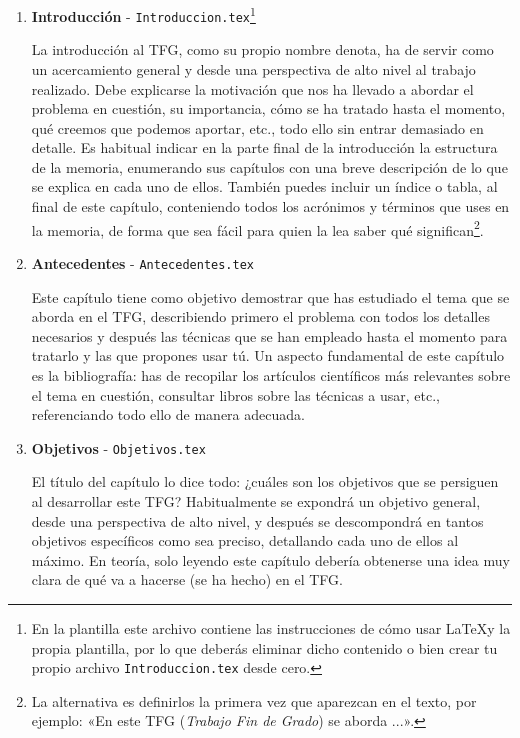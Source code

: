 \begin{enumerate}
    \item \textbf{Introducción} - \texttt{Introduccion.tex}\footnote{En la plantilla este archivo contiene las instrucciones de cómo usar \LaTeX y la propia plantilla, por lo que deberás eliminar dicho contenido o bien crear tu propio archivo \texttt{Introduccion.tex} desde cero.} \par
          La introducción al TFG, como su propio nombre denota, ha de servir como un acercamiento general y desde una perspectiva de alto nivel al trabajo realizado. Debe explicarse la motivación que nos ha llevado a abordar el problema en cuestión, su importancia, cómo se ha tratado hasta el momento, qué creemos que podemos aportar, etc., todo ello sin entrar demasiado en detalle. Es habitual indicar en la parte final de la introducción la estructura de la memoria, enumerando sus capítulos con una breve descripción de lo que se explica en cada uno de ellos. También puedes incluir un índice o tabla, al final de este capítulo, conteniendo todos los acrónimos y términos que uses en la memoria, de forma que sea fácil para quien la lea saber qué significan\footnote{La alternativa es definirlos la primera vez que aparezcan en el texto, por ejemplo: «En este TFG (\textit{Trabajo Fin de Grado}) se aborda ...».}.

    \item \textbf{Antecedentes} - \texttt{Antecedentes.tex} \par
          Este capítulo tiene como objetivo demostrar que has estudiado el tema que se aborda en el TFG, describiendo primero el problema con todos los detalles necesarios y después las técnicas que se han empleado hasta el momento para tratarlo y las que propones usar tú. Un aspecto fundamental de este capítulo es la bibliografía: has de recopilar los artículos científicos más relevantes sobre el tema en cuestión, consultar libros sobre las técnicas a usar, etc., referenciando todo ello de manera adecuada.

    \item \textbf{Objetivos} - \texttt{Objetivos.tex} \par
          El título del capítulo lo dice todo: ¿cuáles son los objetivos que se persiguen al desarrollar este TFG? Habitualmente se expondrá un objetivo general, desde una perspectiva de alto nivel, y después se descompondrá en tantos objetivos específicos como sea preciso, detallando cada uno de ellos al máximo. En teoría, solo leyendo este capítulo debería obtenerse una idea muy clara de qué va a hacerse (se ha hecho) en el TFG.


\end{enumerate}
